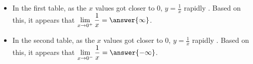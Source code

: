\documentclass{ximera}
\begin{document}
\begin{problem}
\begin{itemize}
  
\item In the first table, as the $x$ values got closer to $0$, $y = \frac{1}{x}$ rapidly .  Based on this, it appears that $\displaystyle\lim_{x \to 0^+} \frac{1}{x} = \answer{\infty}$.

\item In the second table, as the $x$ values got closer to $0$, $y = \frac{1}{x}$ rapidly .  Based on this, it appears that $\displaystyle\lim_{x \to 0^-} \frac{1}{x} = \answer{-\infty}$.

\end{itemize}

\end{problem}


%
\end{document}
